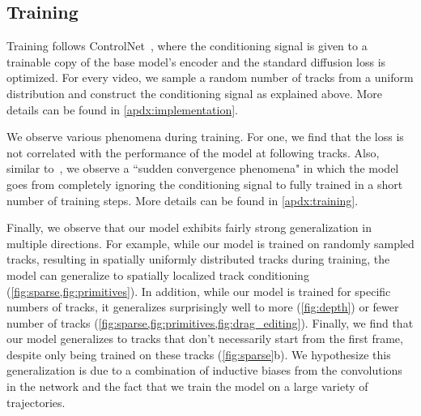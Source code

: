 \subsection{Training}
\label{sec:training}

Training follows ControlNet~\cite{zhang2023adding}, where the conditioning signal is given to a trainable copy of the base model's encoder and the standard diffusion loss is optimized. For every video, we sample a random number of tracks from a uniform distribution and construct the conditioning signal as explained above. More details can be found in \cref{apdx:implementation}.


We observe various phenomena during training. For one, we find that the loss is not correlated with the performance of the model at following tracks. Also, similar to~\cite{zhang2023adding}, we observe a ``sudden convergence phenomena" in which the model goes from completely ignoring the conditioning signal to fully trained in a short number of training steps. More details can be found in \cref{apdx:training}.

Finally, we observe that our model exhibits fairly strong generalization in multiple directions. For example, while our model is trained on randomly sampled tracks, resulting in spatially uniformly distributed tracks during training, the model can generalize to spatially localized track conditioning (\cref{fig:sparse,fig:primitives}). In addition, while our model is trained for specific numbers of tracks, it generalizes surprisingly well to more (\cref{fig:depth}) or fewer number of tracks (\cref{fig:sparse,fig:primitives,fig:drag_editing}). Finally, we find that our model generalizes to tracks that don't necessarily start from the first frame, despite only being trained on these tracks (\cref{fig:sparse}b). We hypothesize this generalization is due to a combination of inductive biases from the convolutions in the network and the fact that we train the model on a large variety of trajectories.

